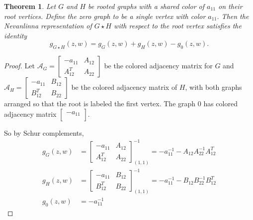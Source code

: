 \documentclass[12pt]{amsart}
\newtheorem{theorem}{Theorem}[section]
\theoremstyle{remark}
\newcommand{\inv}{^{-1}}
\numberwithin{equation}{section}
\newcommand{\cA}{\mathcal{A}}
\begin{document}
\begin{theorem}
Let $G$ and $H$ be rooted graphs with a shared color of $a_{11}$ on their root vertices. Define the zero graph to be a single vertex with color $a_{11}$. Then the Nevanlinna representation of $G \star H$ with respect to the root vertex satisfies the identity
\[
g_{G\star H}(z,w) = g_G(z,w) + g_{H}(z,w) - g_0(z,w).
\]

\end{theorem}

\begin{proof}
Let $\cA_G = \begin{bmatrix}
-a_{11} & A_{12} \\
A_{12}^T & A_{22} 
\end{bmatrix}$  be the colored adjacency matrix for $G$ and $\cA_H = \begin{bmatrix}
-a_{11} & B_{12} \\
B_{12}^T & B_{22} 
\end{bmatrix}$ be the colored adjacency matrix of $H$, with both graphs arranged so that the root is labeled the first vertex. The graph $0$ has colored adjacency matrix $\begin{bmatrix}
    -a_{11}\\
\end{bmatrix}$.

 So by Schur complements, \begin{align*}
    g_{G}(z,w) &=\begin{bmatrix}
-a_{11} & A_{12} \\
A_{12}^T & A_{22} 
\end{bmatrix}\inv_{(1,1)} = -a_{11}\inv - A_{12}A_{22}^{-1}A_{12}^T \\
    g_{H}(z,w) &= \begin{bmatrix}
-a_{11} & B_{12} \\
B_{12}^T & B_{22} 
\end{bmatrix}\inv_{(1,1)} =  -a_{11}\inv - B_{12}B_{22}^{-1}B_{12}^T \\
    g_0(z,w) &= -a_{11}\inv
\end{align*}




\end{proof}
\end{document}
